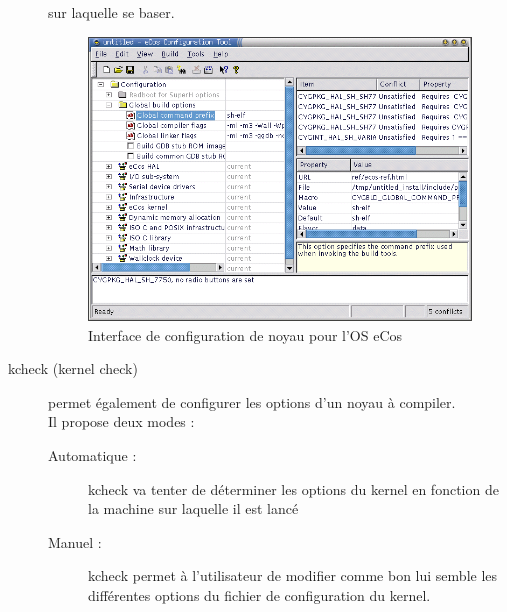 \documentclass[17pts]{report}
\begin{document}
\begin{description}
        sur laquelle se baser. \\
        \begin{figure}[H]
            \includegraphics[scale=1.2]{illustrations/eCos_config.png}
            \centering
            \caption{Interface de configuration de noyau pour l'OS eCos}
            \label{fig:InterfaceEcos}
        \end{figure}
        \pagebreak
    \item[kcheck (kernel check)] permet également de configurer les options
        d’un noyau à compiler. \\
        Il propose deux modes : \\
    \begin{description}
        \item[Automatique :] kcheck va tenter de déterminer les options du kernel
            en fonction de la machine sur laquelle il est lancé
        \item[Manuel :] kcheck permet à l’utilisateur de modifier comme bon lui
            semble les différentes options du fichier de configuration du kernel.
    \end{description}
        \begin{figure}[H]

\end{figure}
\end{description}
\end{document}
